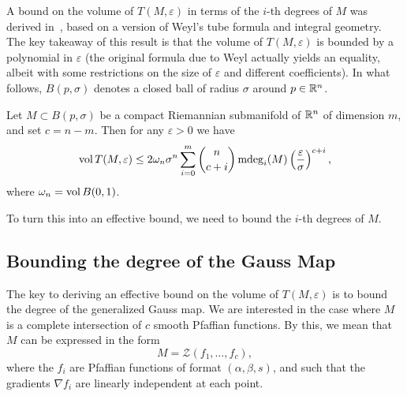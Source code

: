 
A bound on the volume of $T(M,\varepsilon)$ in terms of the $i$-th degrees of $M$ was derived in~\cite[Theorem 4.3]{lotz2015volume},
based on a version of Weyl's tube formula and integral geometry. The key takeaway of this result is that the volume of $T(M, \varepsilon)$ is bounded by a polynomial in $\varepsilon$ (the original formula due to Weyl actually yields an equality, albeit with some restrictions on the size of $\varepsilon$ and different coefficients).
In what follows, $B(p,\sigma)$ denotes a closed ball of radius $\sigma$ around $p\in \mathbb{R}^n$.

\begin{theorem} \label{thm:tube_bound}
Let $M \subset B(p, \sigma)$ be a compact Riemannian submanifold of $\mathbb{R}^n$ of dimension $m$, and set $c=n-m$. Then for any $\varepsilon > 0$ we have 
\begin{equation*}
\operatorname{vol} T(M, \varepsilon) \le 2\omega_n \sigma^n \sum_{i=0}^m \binom{n}{c+i} \operatorname{\mathrm{mdeg}}_i(M) \left(\frac{\varepsilon}{\sigma}\right)^{c+i},
\end{equation*}
where $\omega_n = \operatorname{vol} B(0,1)$.
\end{theorem}

To turn this into an effective bound, we need to bound the $i$-th degrees of $M$.

\subsection{Bounding the degree of the Gauss Map}
The key to deriving an effective bound on the volume of $T(M, \varepsilon)$ is to bound the degree of the generalized Gauss map.
We are interested in the case where $M$ is a complete intersection of $c$ smooth Pfaffian functions. By this, we mean that $M$ 
can be expressed in the form
\begin{equation*}
M = \mathcal{Z}(f_1, \dots, f_c),
\end{equation*}
where the $f_i$ are Pfaffian functions of format $(\alpha, \beta, s)$, and such that the gradients $\nabla f_i$ are linearly independent at each point.

